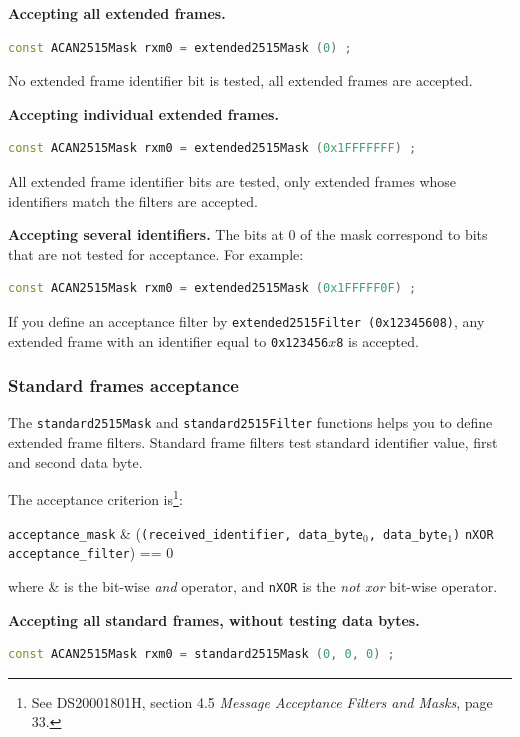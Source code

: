\documentclass[10pt, a4paper, obeyspaces, openany]{extarticle}
\begin{document}
{\bf Accepting all extended frames.}
{ \small\begin{lstlisting}[language=c++]
  const ACAN2515Mask rxm0 = extended2515Mask (0) ;
\end{lstlisting}}
No extended frame identifier bit is tested, all extended frames are accepted.

{\bf Accepting individual extended frames.}
{ \small\begin{lstlisting}[language=c++]
  const ACAN2515Mask rxm0 = extended2515Mask (0x1FFFFFFF) ;
\end{lstlisting}}
All extended frame identifier bits are tested, only extended frames whose identifiers match the filters are accepted.


{\bf Accepting several identifiers.}
The bits at 0 of the mask correspond to bits that are not tested for acceptance. For example:
{ \small\begin{lstlisting}[language=c++]
  const ACAN2515Mask rxm0 = extended2515Mask (0x1FFFFF0F) ;
\end{lstlisting}}

If you define an acceptance filter by \texttt{extended2515Filter (0x12345608)}, any extended frame with an identifier equal to \texttt{0x123456$x$8} is accepted.












\subsubsection{Standard frames acceptance}

The \texttt{standard2515Mask} and \texttt{standard2515Filter} functions helps you to define extended frame filters. Standard frame filters test standard identifier value, first and second data byte.

The acceptance criterion is\footnote{See DS20001801H, section 4.5 \emph{Message Acceptance Filters and Masks}, page 33.}:

\begin{center}\small
\texttt{acceptance\_mask} \& (\texttt{(received\_identifier, data\_byte$_0$, data\_byte$_1$)} \texttt{nXOR} \texttt{acceptance\_filter}) == 0
\end{center}
where \& is the bit-wise \emph{and} operator, and \texttt{nXOR} is the \emph{not xor} bit-wise operator.

{\bf Accepting all standard frames, without testing data bytes.}
{ \small\begin{lstlisting}[language=c++]
  const ACAN2515Mask rxm0 = standard2515Mask (0, 0, 0) ;
\end{lstlisting}}
\end{document}
